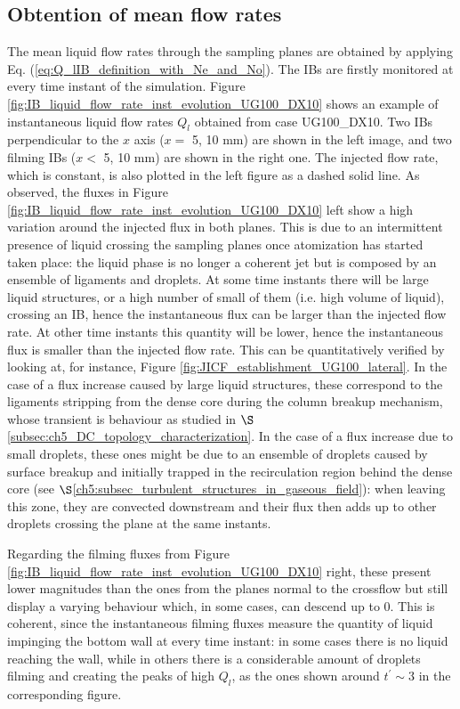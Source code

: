 \subsection{Obtention of mean flow rates}

The mean liquid flow rates through the sampling planes are obtained by applying Eq. (\ref{eq:Q_lIB_definition_with_Ne_and_No}). The IBs are firstly monitored at every time instant of the simulation. Figure \ref{fig:IB_liquid_flow_rate_inst_evolution_UG100_DX10} shows an example of instantaneous liquid flow rates $Q_l$ obtained from case UG100\_DX10. Two IBs perpendicular to the $x$ axis ($x = $ 5, 10 mm) are shown in the left image, and two filming IBs ($x < $ 5, 10 mm) are shown in the right one. The injected flow rate, which is constant, is also plotted in the left figure as a dashed solid line. As observed, the fluxes in Figure \ref{fig:IB_liquid_flow_rate_inst_evolution_UG100_DX10} left show a high variation around the injected flux in both planes. This is due to an intermittent presence of liquid crossing the sampling planes once atomization has started taken place: the liquid phase is no longer a coherent jet but is composed by an ensemble of ligaments and droplets. At some time instants there will be large liquid structures, or a high number of small of them (i.e. high volume of liquid), crossing an IB, hence the instantaneous flux can be larger than the injected flow rate. At other time instants this quantity will be lower, hence the instantaneous flux is smaller than the injected flow rate. This can be quantitatively verified by looking at, for instance, Figure \ref{fig:JICF_establishment_UG100_lateral}. In the case of a flux increase caused by large liquid structures, these correspond to the ligaments stripping from the dense core during the column breakup mechanism, whose transient is behaviour as studied in $\S$\ref{subsec:ch5_DC_topology_characterization}. In the case of a flux increase due to small droplets, these ones might be due to an ensemble of droplets caused by surface breakup and initially trapped in the recirculation region behind the dense core (see $\S$\ref{ch5:subsec_turbulent_structures_in_gaseous_field}): when leaving this zone, they are convected downstream and their flux then adds up to other droplets crossing the plane at the same instants. 

Regarding the filming fluxes from Figure \ref{fig:IB_liquid_flow_rate_inst_evolution_UG100_DX10} right, these present lower magnitudes than the ones from the planes normal to the crossflow but still display a varying behaviour which, in some cases, can descend up to $0$. This is coherent, since the instantaneous filming fluxes measure the quantity of liquid impinging the bottom wall at every time instant: in some cases there is no liquid reaching the wall, while in others there is a considerable amount of droplets filming and creating the peaks of high $Q_l$, as the ones shown around $t^{\prime} \sim 3$ in the corresponding figure.

